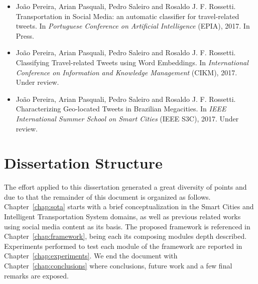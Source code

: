 \begin{itemize}
		\item
		João Pereira, Arian Pasquali, Pedro Saleiro and Rosaldo J. F. Rossetti. {\color{blue}Transportation in Social Media: an automatic classifier for travel-related tweets}. In \emph{Portuguese Conference on Artificial Intelligence} (EPIA), 2017. In Press.
		
		\item
		João Pereira, Arian Pasquali, Pedro Saleiro and Rosaldo J. F. Rossetti. {\color{blue}Classifying Travel-related Tweets using Word Embeddings}. In \emph{International Conference on Information and Knowledge Management} (CIKM), 2017. Under review.
		
		\item
		João Pereira, Arian Pasquali, Pedro Saleiro and Rosaldo J. F. Rossetti. {\color{blue}Characterizing Geo-located Tweets in Brazilian Megacities}. In \emph{IEEE International Summer School on Smart Cities} (IEEE S3C), 2017. Under review.
\end{itemize}

\section{Dissertation Structure}\label{sec:diss_structure}
The effort applied to this dissertation generated a great diversity of points and due to that the remainder of this document is organized as follows.
Chapter~\ref{chap:sota} starts with a brief conceptualization in the Smart Cities and Intelligent Transportation System domains, as well as previous related works using social media content as its basis.
The proposed framework is referenced in Chapter~\ref{chap:framework}, being each its composing modules depth described.
Experiments performed to test each module of the framework are reported in Chapter~\ref{chap:experiments}.
We end the document with Chapter~\ref{chap:conclusions} where conclusions, future work and a few final remarks are exposed.